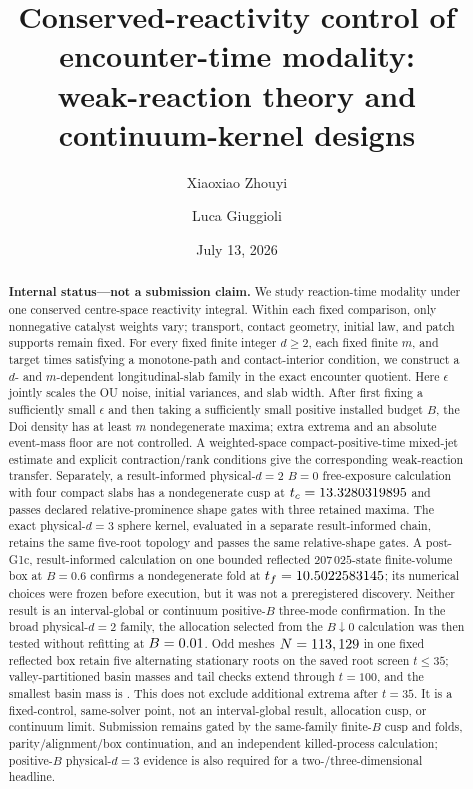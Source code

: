 \documentclass[aps,physrev,reprint,amsmath,amssymb,longbibliography,floatfix]{revtex4-2}
\begin{document}
\title{Conserved-reactivity control of encounter-time modality:\\
weak-reaction theory and continuum-kernel designs}

\author{Xiaoxiao Zhouyi}
\author{Luca Giuggioli}

\date{July 13, 2026}

\begin{abstract}
\textbf{Internal status---not a submission claim.}
We study reaction-time modality under one conserved centre-space reactivity
integral.  Within each fixed comparison, only nonnegative catalyst weights
vary; transport, contact geometry, initial law, and patch supports remain
fixed.  For every fixed finite integer $d\ge2$, each fixed finite $m$, and
target times satisfying a monotone-path and contact-interior condition, we
construct a $d$- and $m$-dependent longitudinal-slab family in the exact
encounter quotient.  Here $\epsilon$
jointly scales the OU noise, initial variances, and slab width.  After first
fixing a sufficiently small $\epsilon$ and then taking a sufficiently small
positive installed budget $B$, the Doi density has at least $m$
nondegenerate maxima; extra extrema and an absolute event-mass floor are not
controlled.  A weighted-space compact-positive-time mixed-jet estimate and
explicit contraction/rank conditions give the corresponding weak-reaction
transfer.  Separately, a result-informed physical-$d=2$ $B=0$ free-exposure
calculation with four compact slabs has a nondegenerate cusp at
$t_c=13.3280319895$ and passes declared relative-prominence shape gates
with three retained maxima.  The exact physical-$d=3$ sphere kernel, evaluated
in a separate result-informed chain, retains the same five-root topology and
passes the same relative-shape gates.  A post-G1c, result-informed calculation on one
bounded reflected $207\,025$-state finite-volume box at $B=0.6$ confirms a
nondegenerate fold at $t_f=10.5022583145$; its numerical choices were frozen
before execution, but it was not a preregistered discovery.  Neither result
is an interval-global or continuum positive-$B$ three-mode confirmation.  In
the broad physical-$d=2$ family, the allocation selected from the
$B\downarrow0$ calculation was then tested without refitting at
$B=0.01$.  Odd meshes $N=113,129$ in
one fixed reflected box retain five alternating stationary roots on the saved
root screen $t\leq35$; valley-partitioned basin masses and tail checks extend
through $t=100$, and the smallest basin mass is \PositiveBMinimumBasinMass.
This does not exclude additional extrema after $t=35$.  It is a fixed-control,
same-solver point, not an interval-global result, allocation cusp, or continuum
limit.  Submission remains gated by the same-family finite-$B$
cusp and folds, parity/alignment/box continuation, and an independent
killed-process calculation; positive-$B$ physical-$d=3$ evidence is also
required for a two-/three-dimensional headline.
\end{abstract}
\end{document}
